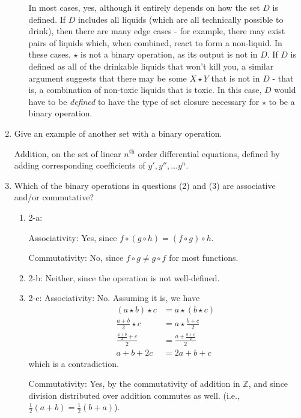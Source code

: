 \documentclass{scrartcl}
\begin{document}
\begin{enumerate}
\begin{enumerate}
				In most cases, yes, although it entirely depends on how the set $D$ is defined. If $D$ includes all liquids (which are all technically possible to drink), then there are many edge cases - for example, there may exist pairs of liquids which, when combined, react to form a non-liquid. In these cases, $\star$ is not a binary operation, as its output is not in $D$. If $D$ is defined as all of the drinkable liquids that won't kill you, a similar argument suggests that there may be some $X\star Y$ that is not in $D$ - that is, a combination of non-toxic liquids that is toxic. In this case, $D$ would have to be \textit{defined} to have the type of set closure necessary for $\star$ to be a binary operation.
			
		\end{enumerate}
		
	\item Give an example of another set with a binary operation.
	
		Addition, on the set of linear $n^{\textrm{th}}$ order differential equations, defined by adding corresponding coefficients of $y', y'', \dots y^n$.
			
	\item Which of the binary operations in questions (2) and (3) are associative and/or commutative?
		\begin{enumerate}
			\item 2-a: 
			
				Associativity: Yes, since $f\circ (g\circ h) = (f\circ g)\circ h$.
				
				Commutativity: No, since $f\circ g \neq g\circ f$ for most functions.
				
			\item 2-b:
				Neither, since the operation is not well-defined.
				
			\item 2-c:
				Associativity: No. Assuming it is, we have
				\begin{align*}
					(a\star b)\star c &= a\star (b\star c) \\
					\frac{a+b}{2}\star c &= a\star \frac{b+c}{2} \\
					\frac{\frac{a+b}{2}+c}{2} &= \frac{a+\frac{b+c}{2}}{2} \\
					a + b + 2c &= 2a + b +c
				\end{align*}
				which is a contradiction.
				
				Commutativity: Yes, by the commutativity of addition in $\mathbb{Z}$, and since division distributed over addition commutes as well. (i.e., $\frac{1}{2}(a+b) = \frac{1}{2}(b+a)$).
				

\end{enumerate}
\end{enumerate}
\end{document}
